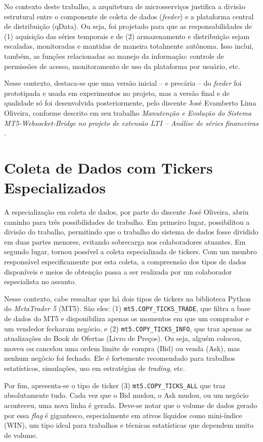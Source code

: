 No contexto deste trabalho, a arquitetura de microsserviços justifica a divisão estrutural entre o componente de coleta de dados (\textit{feeder}) e a plataforma central de distribuição (qData). Ou seja, foi projetado para que as responsabilidades de (1) aquisição das séries temporais e de (2) armazenamento e distribuição sejam escaladas, monitoradas e mantidas de maneira totalmente autônoma. Isso inclui, também, as funções relacionadas ao manejo da informação: controle de permissões de acesso, monitoramento de uso da plataforma por usuário, etc.

Nesse contexto, destaca-se que uma versão inicial – e precária – do \textit{feeder} foi prototipada e usada em experimentos no projeto, mas a versão final e de qualidade só foi desenvolvida posteriormente, pelo discente José Evamberto Lima Oliveira, conforme descrito em seu trabalho \textit{Manutenção e Evolução do Sistema MT5-Websocket-Bridge no projeto de extensão LTI – Análise de séries financeiras} \cite{oliveira2026}.

\section{Coleta de Dados com Tickers Especializados}

A especialização em coleta de dados, por parte do discente José Oliveira, abriu caminho para três possibilidades de trabalho. Em primeiro lugar, possibilitou a divisão do trabalho, permitindo que o trabalho do sistema de dados fosse dividido em duas partes menores, evitando sobrecarga nos colaboradores atuantes. Em segundo lugar, tornou possível a coleta especializada de tickers. Com um membro responsável especificamente por esta coleta, a compreensão dos tipos de dados disponíveis e meios de obtenção passa a ser realizada por um colaborador especialista no assunto.

Nesse contexto, cabe ressaltar que há dois tipos de tickers na biblioteca Python do \textit{MetaTrader 5} (MT5). São eles: (1) \texttt{mt5.COPY\_TICKS\_TRADE}, que filtra a base de dados do MT5 e disponibiliza apenas os momentos em que um comprador e um vendedor fecharam negócio, e (2) \texttt{mt5.COPY\_TICKS\_INFO}, que traz apenas as atualizações do Book de Ofertas (Livro de Preços). Ou seja, alguém colocou, moveu ou cancelou uma ordem limite de compra (Bid) ou venda (Ask), mas nenhum negócio foi fechado. Ele é fortemente recomendado para trabalhos estatísticos, simulações, uso em estratégias de \textit{trading}, etc.

Por fim, apresenta-se o tipo de ticker (3) \texttt{mt5.COPY\_TICKS\_ALL} que traz absolutamente tudo. Cada vez que o Bid mudou, o Ask mudou, ou um negócio aconteceu, uma nova linha é gerada. Deve-se notar que o volume de dados gerado por essa \textit{flag} é gigantesco, especialmente em ativos líquidos como mini-índice (WIN), um tipo ideal para trabalhos e técnicas estatísticas que dependem muito de volume.

